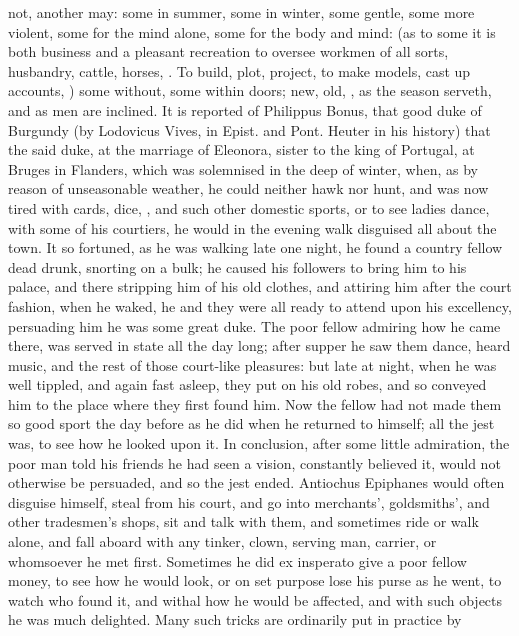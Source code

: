 {not, another may: some in summer, some in winter, some gentle, some
more violent, some for the mind alone, some for the body and mind: (as
to some it is both business and a pleasant recreation to oversee
workmen of all sorts, husbandry, cattle, horses, \etc{}. To build, plot,
project, to make models, cast up accounts, \etc{}) some without, some
within doors; new, old, \etc{}, as the season serveth, and as men are
inclined. It is reported of Philippus Bonus, that good duke of Burgundy
(by Lodovicus Vives, in Epist. and Pont. Heuter in his history)
that the said duke, at the marriage of Eleonora, sister to the king of
Portugal, at Bruges in Flanders, which was solemnised in the deep of
winter, when, as by reason of unseasonable weather, he could neither
hawk nor hunt, and was now tired with cards, dice, \etc{}, and such other
domestic sports, or to see ladies dance, with some of his courtiers, he
would in the evening walk disguised all about the town. It so fortuned,
as he was walking late one night, he found a country fellow dead drunk,
snorting on a bulk; he caused his followers to bring him to his
palace, and there stripping him of his old clothes, and attiring him
after the court fashion, when he waked, he and they were all ready to
attend upon his excellency, persuading him he was some great duke. The
poor fellow admiring how he came there, was served in state all the day
long; after supper he saw them dance, heard music, and the rest of
those court-like pleasures: but late at night, when he was well
tippled, and again fast asleep, they put on his old robes, and so
conveyed him to the place where they first found him. Now the fellow
had not made them so good sport the day before as he did when he
returned to himself; all the jest was, to see how he looked upon
it. In conclusion, after some little admiration, the poor man told his
friends he had seen a vision, constantly believed it, would not
otherwise be persuaded, and so the jest ended. Antiochus
Epiphanes would often disguise himself, steal from his court, and go
into merchants', goldsmiths', and other tradesmen's shops, sit and talk
with them, and sometimes ride or walk alone, and fall aboard with any
tinker, clown, serving man, carrier, or whomsoever he met first.
Sometimes he did ex insperato give a poor fellow money, to see how he
would look, or on set purpose lose his purse as he went, to watch who
found it, and withal how he would be affected, and with such objects he
was much delighted. Many such tricks are ordinarily put in practice by
}
